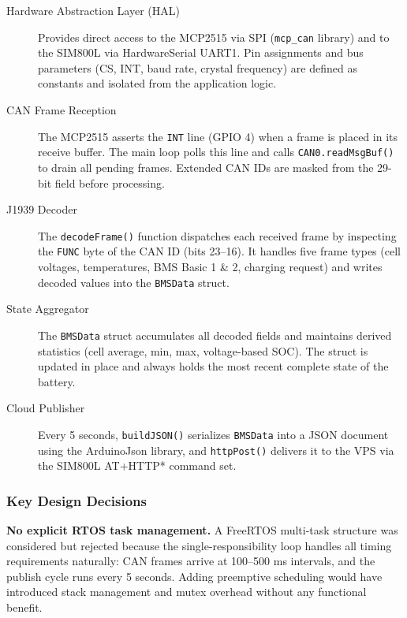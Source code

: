 \begin{description}
    \item[Hardware Abstraction Layer (HAL)]
    Provides direct access to the MCP2515 via SPI (\texttt{mcp\_can} library) and to the SIM800L via HardwareSerial UART1. Pin assignments and bus parameters (CS, INT, baud rate, crystal frequency) are defined as constants and isolated from the application logic.

    \item[CAN Frame Reception]
    The MCP2515 asserts the \texttt{INT} line (GPIO 4) when a frame is placed in its receive buffer. The main loop polls this line and calls \texttt{CAN0.readMsgBuf()} to drain all pending frames. Extended CAN IDs are masked from the 29-bit field before processing.

    \item[J1939 Decoder]
    The \texttt{decodeFrame()} function dispatches each received frame by inspecting the \texttt{FUNC} byte of the CAN ID (bits 23--16). It handles five frame types (cell voltages, temperatures, BMS Basic 1 \& 2, charging request) and writes decoded values into the \texttt{BMSData} struct.

    \item[State Aggregator]
    The \texttt{BMSData} struct accumulates all decoded fields and maintains derived statistics (cell average, min, max, voltage-based SOC). The struct is updated in place and always holds the most recent complete state of the battery.

    \item[Cloud Publisher]
    Every 5 seconds, \texttt{buildJSON()} serializes \texttt{BMSData} into a JSON document using the ArduinoJson library, and \texttt{httpPost()} delivers it to the VPS via the SIM800L AT+HTTP* command set.
\end{description}

\subsubsection{Key Design Decisions}

\textbf{No explicit RTOS task management.} A FreeRTOS multi-task structure was considered but rejected because the single-responsibility loop handles all timing requirements naturally: CAN frames arrive at 100--500 ms intervals, and the publish cycle runs every 5 seconds. Adding preemptive scheduling would have introduced stack management and mutex overhead without any functional benefit.

